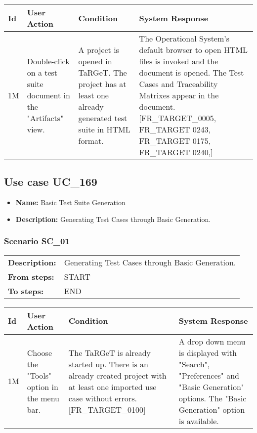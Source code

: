 \documentclass[a4paper,11pt]{article}
\newcommand{\bl}{\\ \hline}
\begin{document}
\begin{tabular}{|p{0.8in}|p{1.6in}|p{1.6in}|p{1.6in}|}
\hline
Id & User Action & Condition & System Response  \bl 
1M & Double-click on a test suite document in the "Artifacts"
		view. & A project is opened in TaRGeT. The project has at least
		one already generated test suite in HTML format. & The Operational System's default browser to open HTML
		files is invoked and the document is opened. The Test Cases and
		Traceability Matrixes appear in the document.[FR_TARGET_0005,
		FR_TARGET 0243, FR_TARGET 0175, FR_TARGET 0240,] \bl 
\end{tabular}
\subsection*{Use case UC_169}
\begin{itemize}
\item {\bf Name: }Basic Test Suite Generation 
\item {\bf Description: }Generating Test Cases through Basic Generation.
	  
\end{itemize}
\subsubsection*{Scenario SC_01}
\begin{tabular}{p{1in}p{4in}}
{\bf Description:} & Generating Test Cases through Basic Generation.
	     \\
{\bf From steps:} & START \\
{\bf To steps:} & END \\
\end{tabular}
 
\begin{tabular}{|p{0.8in}|p{1.6in}|p{1.6in}|p{1.6in}|}
\hline
Id & User Action & Condition & System Response  \bl 
1M & Choose the "Tools" option in the menu bar.  & The TaRGeT is already started up. There is an already
		created project with at least one imported use case without
		errors. [FR_TARGET_0100] & A drop down menu is displayed with "Search",
		"Preferences" and "Basic Generation" options. The "Basic
		Generation" option is available.  \bl 
\end{tabular}
\end{document}
